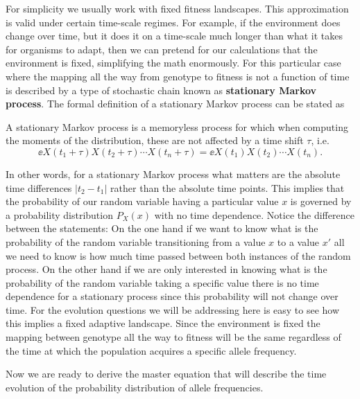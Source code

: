 For simplicity we usually work with fixed fitness landscapes. This approximation
is valid under certain time-scale regimes. For example, if the environment does
change over time, but it does it on a time-scale much longer than what it takes
for organisms to adapt, then we can pretend for our calculations that the
environment is fixed, simplifying the math enormously. For this particular case
where the mapping all the way from genotype to fitness is not a function of time
is described by a type of stochastic chain known as \textbf{stationary Markov
process}. The formal definition of a stationary Markov process can be stated as
\begin{tcolorbox}
  A stationary Markov process is a memoryless process for which when computing
  the moments of the distribution, these are not affected by a time shift
  $\tau$, i.e.
  \begin{equation}
    \ee{X(t_1 + \tau) X(t_2 + \tau) \cdots X(t_n + \tau)} =
    \ee{X(t_1) X(t_2) \cdots X(t_n)}.
  \end{equation}
\end{tcolorbox}
In other words, for a stationary Markov process what matters are the absolute
time differences $|t_2 - t_1|$ rather than the absolute time points. This
implies that the probability of our random variable having a particular value
$x$ is governed by a probability distribution $P_X(x)$ with no time dependence.
Notice the difference between the statements: On the one hand if we want to know
what is the probability of the random variable transitioning from a value $x$ to
a value $x'$ all we need to know is how much time passed between both
instances of the random process. On the other hand if we are only interested in
knowing what is the probability of the random variable taking a specific value
there is no time dependence for a stationary process since this probability will
not change over time. For the evolution questions we will be addressing here is
easy to see how this implies a fixed adaptive landscape. Since the environment
is fixed the mapping between genotype all the way to fitness will be the same
regardless of the time at which the population acquires a specific allele
frequency.

Now we are ready to derive the master equation that will describe the time
evolution of the probability distribution of allele frequencies.
